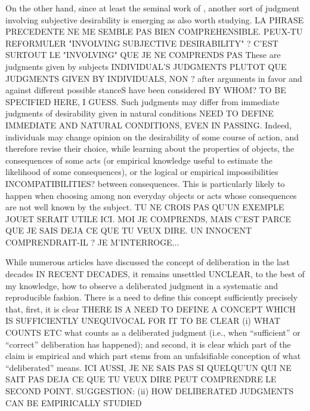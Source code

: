\documentclass[version=last, pagesize, twoside=off, bibliography=totoc, DIV=calc, fontsize=12pt, a4paper, french, english]{scrartcl}
\begin{document}
On the other hand, since at least the seminal work of \citet{fishkin_when_2011}, another sort of judgment involving subjective desirability is emerging as also worth studying. LA PHRASE PRECEDENTE NE ME SEMBLE PAS BIEN COMPREHENSIBLE. PEUX-TU REFORMULER "INVOLVING SUBJECTIVE DESIRABILITY" ? C'EST SURTOUT LE "INVOLVING" QUE JE NE COMPRENDS PAS These are judgments given by subjects INDIVIDUAL'S JUDGMENTS PLUTOT QUE JUDGMENTS GIVEN BY INDIVIDUALS, NON ? after arguments in favor and against different possible stanceS have been considered BY WHOM? TO BE SPECIFIED HERE, I GUESS. Such judgments may differ from immediate judgments of desirability given in natural conditions NEED TO DEFINE IMMEDIATE AND NATURAL CONDITIONS, EVEN IN PASSING. Indeed, individuals may change opinion on the desirability of some course of action, and therefore revise their choice, while learning about the properties of objects, the consequences of some acts (or empirical knowledge useful to estimate the likelihood of some consequences), or the logical or empirical impossibilities INCOMPATIBILITIES? between consequences. This is particularly likely to happen when choosing among non everyday objects or acts whose consequences are not well known by the subject. TU NE CROIS PAS QU'UN EXEMPLE JOUET SERAIT UTILE ICI. MOI JE COMPRENDS, MAIS C'EST PARCE QUE JE SAIS DEJA CE QUE TU VEUX DIRE. UN INNOCENT COMPRENDRAIT-IL ? JE M'INTERROGE...

While numerous articles have discussed the concept of deliberation in the last decades IN RECENT DECADES, it remains unsettled UNCLEAR, to the best of my knowledge, how to observe a deliberated judgment in a systematic and reproducible fashion. There is a need to define this concept sufficiently precisely that, first, it is clear THERE IS A NEED TO DEFINE A CONCEPT WHICH IS SUFFICIENTLY UNEQUIVOCAL FOR IT TO BE CLEAR (i) WHAT COUNTS ETC what counts as a deliberated judgment (i.e., when “sufficient” \citep{meinard_justification_2020} or “correct” deliberation has happened); and second, it is clear which part of the claim is empirical and which part stems from an unfalsifiable conception of what “deliberated” means. ICI AUSSI, JE NE SAIS PAS SI QUELQU'UN QUI NE SAIT PAS DEJA CE QUE TU VEUX DIRE PEUT COMPRENDRE LE SECOND POINT. SUGGESTION: (ii) HOW DELIBERATED JUDGMENTS CAN BE EMPIRICALLY STUDIED
\end{document}
